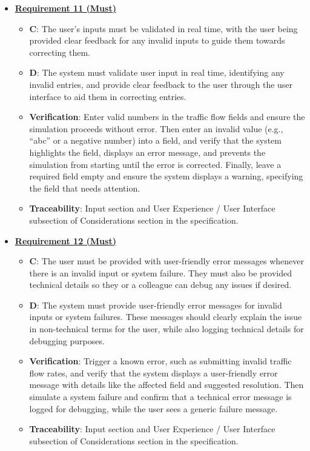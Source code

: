 \documentclass{article}
\begin{document}
\begin{itemize}
    \item \textbf{\underline{Requirement 11 (Must)}}
    \begin{itemize}
        \item \textbf{C}: The user's inputs must be validated in real time, with the user being provided clear 
        feedback for any invalid inputs to guide them towards correcting them.
        \item \textbf{D}: The system must validate user input in real time, identifying any invalid entries, 
        and provide clear feedback to the user through the user interface to aid them in correcting entries.
        \item \textbf{Verification}: Enter valid numbers in the traffic flow fields and ensure the 
        simulation proceeds without error. Then enter an invalid value (e.g., “abc” or a negative number) into 
        a field, and verify that the system highlights the field, displays an error message, and prevents the 
        simulation from starting until the error is corrected. Finally, leave a required field empty and ensure 
        the system displays a warning, specifying the field that needs attention.
        \item\textbf{Traceability}: Input section and User Experience / User Interface subsection of 
        Considerations section in the specification.
    \end{itemize}

    \item \textbf{\underline{Requirement 12 (Must)}}
    \begin{itemize}
        \item \textbf{C}: The user must be provided with user-friendly error messages whenever there is an invalid 
        input or system failure. They must also be provided technical details so they or a colleague can debug any 
        issues if desired.
        \item \textbf{D}: The system must provide user-friendly error messages for invalid inputs or system failures. 
        These messages should clearly explain the issue in non-technical terms for the user, while also logging 
        technical details for debugging purposes.
        \item \textbf{Verification}: Trigger a known error, such as submitting invalid traffic flow rates, and verify 
        that the system displays a user-friendly error message with details like the affected field and suggested 
        resolution. Then simulate a system failure and confirm that a technical error message is logged for debugging, 
        while the user sees a generic failure message.
        \item\textbf{Traceability}: Input section and User Experience / User Interface subsection of Considerations 
        section in the specification.
    \end{itemize}
\end{itemize}
\end{document}
